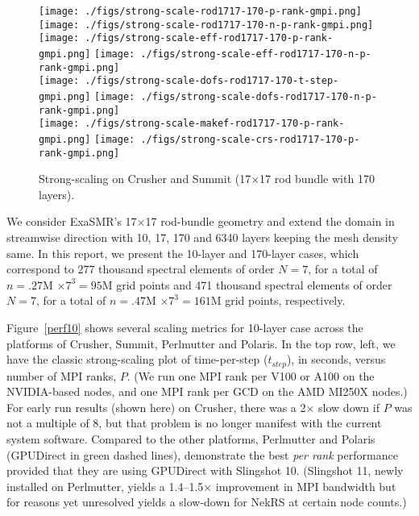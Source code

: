 \begin{figure*}[t]
  \begin{center}
     \texttt{[image: ./figs/strong-scale-rod1717-170-p-rank-gmpi.png]}
     \texttt{[image: ./figs/strong-scale-rod1717-170-n-p-rank-gmpi.png]}
     \\
     \texttt{[image: ./figs/strong-scale-eff-rod1717-170-p-rank-gmpi.png]}
     \texttt{[image: ./figs/strong-scale-eff-rod1717-170-n-p-rank-gmpi.png]}
     \\
     \texttt{[image: ./figs/strong-scale-dofs-rod1717-170-t-step-gmpi.png]}
     \texttt{[image: ./figs/strong-scale-dofs-rod1717-170-n-p-rank-gmpi.png]}
     \\
     \texttt{[image: ./figs/strong-scale-makef-rod1717-170-p-rank-gmpi.png]}
     \texttt{[image: ./figs/strong-scale-crs-rod1717-170-p-rank-gmpi.png]}
   \caption{\label{perf170}Strong-scaling on Crusher and Summit (17$\times$17 rod bundle with 170 layers).}
  \end{center}
\end{figure*}



\medskip
We consider ExaSMR's 17$\times$17 rod-bundle geometry and extend the domain in
streamwise direction with 10, 17, 170 and 6340 layers keeping the mesh density
same. In this report, we present the 10-layer and 170-layer cases, which correspond to
277 thousand spectral elements of order $N=7$, for a total of
$n=.27$M $\times 7^3 = 95$M grid points and
471 thousand spectral elements of order $N=7$, for a total of 
$n=.47$M $\times 7^3 = 161$M grid points, respectively.


Figure~\ref{perf10} shows several scaling metrics for 10-layer case across the
platforms of Crusher, Summit, Perlmutter and Polaris.  
In the top row, left, we have the classic strong-scaling plot of
time-per-step ($t_{step}$), in seconds, versus number of MPI ranks, $P$.  (We run
one MPI rank per V100 or A100 on the NVIDIA-based nodes, and one MPI rank per
GCD on the AMD MI250X nodes.)   For early run results (shown here) on Crusher,
there was a 2$\times$ slow down if $P$ was not a multiple of 8, but that problem
is no longer manifest with the current system software.  
Compared to the other platforms,
Perlmutter and Polaris (GPUDirect in green dashed lines), demonstrate the 
best {\em per rank} performance provided that they are using GPUDirect with Slingshot 10.
(Slingshot 11, newly installed on Perlmutter, yields a 1.4--1.5$\times$ improvement
in MPI bandwidth but for reasons yet unresolved yields a slow-down for NekRS at
certain node counts.)   

